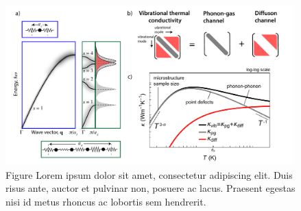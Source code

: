 \begin{figure}
  \centering
  \includegraphics[width=0.99\textwidth, keepaspectratio]{test-fig.pdf}
  \caption{Figure Lorem ipsum dolor sit amet, consectetur adipiscing elit. Duis risus ante, auctor et pulvinar non, posuere ac lacus. Praesent egestas nisi id metus rhoncus ac lobortis sem hendrerit.}
  \label{fig:test}
\end{figure}


